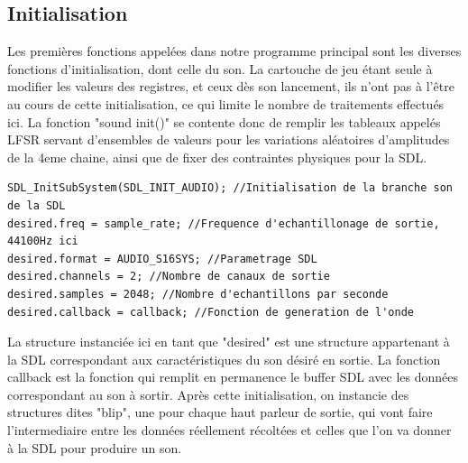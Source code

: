 \documentclass{report}
\begin{document}
\subsection{Initialisation}
Les premières fonctions appelées dans notre programme principal sont les diverses fonctions d'initialisation, dont celle du son.
La cartouche de jeu étant seule à modifier les valeurs des registres, et ceux dès son lancement, ils n'ont pas à l'être au cours de cette initialisation, ce qui limite le nombre de traitements effectués ici.
La fonction "sound init()" se contente donc de remplir les tableaux appelés LFSR servant d'ensembles de valeurs pour les variations aléatoires d'amplitudes de la 4eme chaine, ainsi que de fixer des contraintes physiques pour la SDL.
\begin{lstlisting}
SDL_InitSubSystem(SDL_INIT_AUDIO); //Initialisation de la branche son de la SDL
desired.freq = sample_rate; //Frequence d'echantillonage de sortie, 44100Hz ici
desired.format = AUDIO_S16SYS; //Parametrage SDL
desired.channels = 2; //Nombre de canaux de sortie
desired.samples = 2048; //Nombre d'echantillons par seconde
desired.callback = callback; //Fonction de generation de l'onde
\end{lstlisting}
La structure instanciée ici en tant que "desired" est une structure appartenant à la SDL correspondant aux caractéristiques du son désiré en sortie.
La fonction callback est la fonction qui remplit en permanence le buffer SDL avec les données correspondant au son à sortir.
Après cette initialisation, on instancie des structures dites "blip", une pour chaque haut parleur de sortie, qui vont faire l'intermediaire entre les données réellement récoltées et celles que l'on va donner à la SDL pour produire un son.
\end{document}

